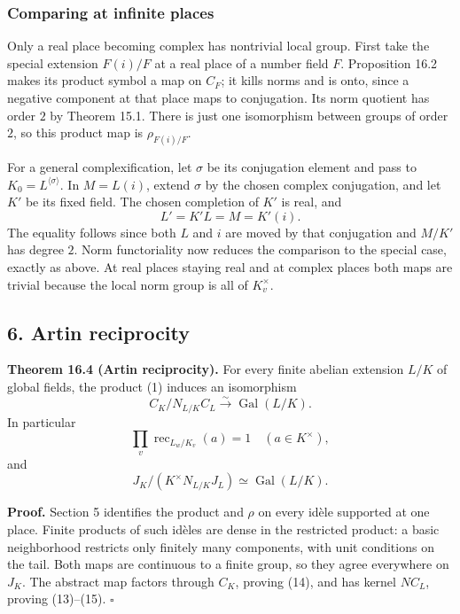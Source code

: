 \documentclass[11pt,a4paper]{article}
\begin{document}
\subsubsection{Comparing at infinite
places}\label{comparing-at-infinite-places}

Only a real place becoming complex has nontrivial local group. First
take the special extension \(F(i)/F\) at a real place of a number field
\(F\). Proposition 16.2 makes its product symbol a map on \(C_F\); it
kills norms and is onto, since a negative component at that place maps
to conjugation. Its norm quotient has order \(2\) by Theorem 15.1. There
is just one isomorphism between groups of order \(2\), so this product
map is \(\rho_{F(i)/F}\).

For a general complexification, let \(\sigma\) be its conjugation
element and pass to \(K_0=L^{\langle\sigma\rangle}\). In \(M=L(i)\),
extend \(\sigma\) by the chosen complex conjugation, and let \(K'\) be
its fixed field. The chosen completion of \(K'\) is real, and \[
L'=K'L=M=K'(i).
\] The equality follows since both \(L\) and \(i\) are moved by that
conjugation and \(M/K'\) has degree \(2\). Norm functoriality now
reduces the comparison to the special case, exactly as above. At real
places staying real and at complex places both maps are trivial because
the local norm group is all of \(K_v^\times\).

\subsection{6. Artin reciprocity}\label{artin-reciprocity}

\textbf{Theorem 16.4 (Artin reciprocity).} For every finite abelian
extension \(L/K\) of global fields, the product (1) induces an
isomorphism \[
C_K/N_{L/K}C_L\xrightarrow{\sim}\operatorname{Gal}(L/K).
\tag{13}
\] In particular \[
\prod_v\operatorname{rec}_{L_w/K_v}(a)=1
\quad(a\in K^\times),
\tag{14}
\] and \[
J_K/(K^\times N_{L/K}J_L)\simeq\operatorname{Gal}(L/K).
\tag{15}
\]

\textbf{Proof.} Section 5 identifies the product and \(\rho\) on every
idèle supported at one place. Finite products of such idèles are dense
in the restricted product: a basic neighborhood restricts only finitely
many components, with unit conditions on the tail. Both maps are
continuous to a finite group, so they agree everywhere on \(J_K\). The
abstract map factors through \(C_K\), proving (14), and has kernel
\(NC_L\), proving (13)--(15). \(\square\)
\end{document}
